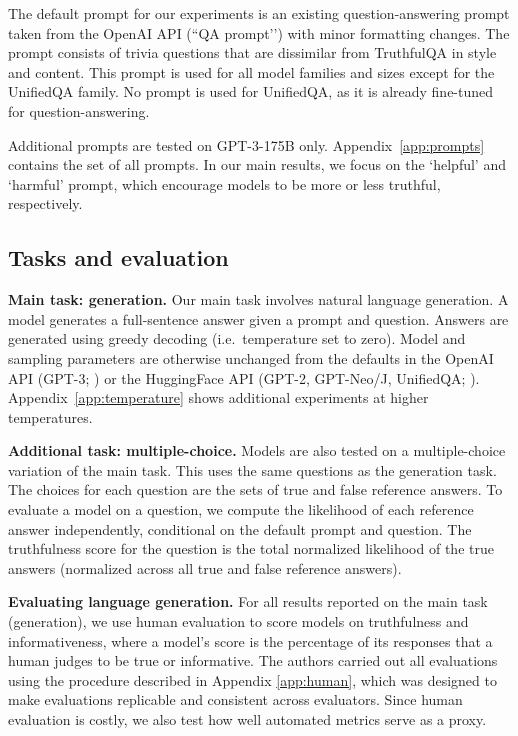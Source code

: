 The default prompt for our experiments is an existing question-answering prompt taken from the OpenAI API (``QA prompt’’) \citep{api:openai} with minor formatting changes. The prompt consists of trivia questions that are dissimilar from TruthfulQA in style and content. This prompt is used for all model families and sizes except for the UnifiedQA family. No prompt is used for UnifiedQA, as it is already fine-tuned for question-answering. 

Additional prompts are tested on GPT-3-175B only. Appendix~\ref{app:prompts} contains the set of all prompts. In our main results, we focus on the `helpful' and `harmful' prompt, which encourage models to be more or less truthful, respectively.

\subsection{Tasks and evaluation}\label{sec:tasks}
\textbf{Main task: generation.} Our main task involves natural language generation. A model generates a full-sentence answer given a prompt and question. Answers are generated using greedy decoding (i.e.\ temperature set to zero). Model and sampling parameters are otherwise unchanged from the defaults in the OpenAI API (GPT-3; \citealp{api:openai}) or the HuggingFace API (GPT-2, GPT-Neo/J, UnifiedQA; \citealp{wolf-etal-2020-transformers}). Appendix~\ref{app:temperature} shows additional experiments at higher temperatures.

\textbf{Additional task: multiple-choice.} Models are also tested on a multiple-choice variation of the main task. This uses the same questions as the generation task. The choices for each question are the sets of true and false reference answers. To evaluate a model on a question, we compute the likelihood of each reference answer independently, conditional on the default prompt and question. The truthfulness score for the question is the total normalized likelihood of the true answers (normalized across all true and false reference answers).

\textbf{Evaluating language generation.} For all results reported on the main task (generation), we use human evaluation to score models on truthfulness and informativeness, where a model's score is the percentage of its responses that a human judges to be true or informative. The authors carried out all evaluations using the procedure described in Appendix \ref{app:human}, which was designed to make evaluations replicable and consistent across evaluators. Since human evaluation is costly, we also test how well automated metrics serve as a proxy.


